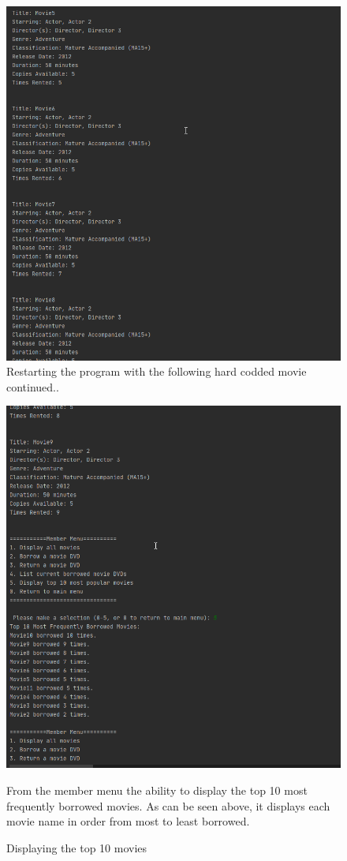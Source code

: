 \documentclass[a4paper,12pt]{article}
\begin{document}
\begin{figure}[!htb]
\centering
\includegraphics[width=1\textwidth]{17}
\caption{Restarting the program with the following hard codded movie continued..}
\medskip
\small

\end{figure}

\begin{figure}[!htb]
\centering
\includegraphics[width=1\textwidth]{18}
\caption{Displaying the top 10 movies}
\medskip
\small
From the member menu the ability to display the top 10 most frequently borrowed movies. As can be seen above, it displays each movie name in order from most to least borrowed.
\end{figure}
\end{document}
